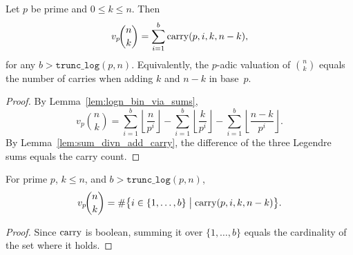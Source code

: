 
\begin{theorem}
  \label{thm:kummer}
  \rocqok
  Let $p$ be prime and $0 \leq k \leq n$. Then
  \[
    v_p\!\binom{n}{k} = \sum_{i=1}^{b} \mathrm{carry}(p, i, k, n-k),
  \]
  for any $b > \texttt{trunc\_log}(p, n)$.
  Equivalently, the $p$-adic valuation of $\binom{n}{k}$ equals
  the number of carries when adding $k$ and $n-k$ in base~$p$.
  \begin{proof}
    \rocqok
    By Lemma~\ref{lem:logn_bin_via_sums},
    \[
      v_p\!\binom{n}{k}
      = \sum_{i=1}^{b} \left\lfloor \frac{n}{p^i} \right\rfloor
      - \sum_{i=1}^{b} \left\lfloor \frac{k}{p^i} \right\rfloor
      - \sum_{i=1}^{b} \left\lfloor \frac{n-k}{p^i} \right\rfloor.
    \]
    By Lemma~\ref{lem:sum_divn_add_carry}, the difference of the
    three Legendre sums equals the carry count.
  \end{proof}
\end{theorem}

\begin{theorem}
  \label{thm:kummer_card}
  \rocqok
  For prime $p$, $k \leq n$, and $b > \texttt{trunc\_log}(p, n)$,
  \[
    v_p\!\binom{n}{k}
    = \#\bigl\{i \in \{1, \ldots, b\}
      \;\big|\; \mathrm{carry}(p, i, k, n-k) \bigr\}.
  \]
  \begin{proof}
    \rocqok
    Since $\mathrm{carry}$ is boolean, summing it over $\{1, \ldots, b\}$
    equals the cardinality of the set where it holds.
  \end{proof}
\end{theorem}
